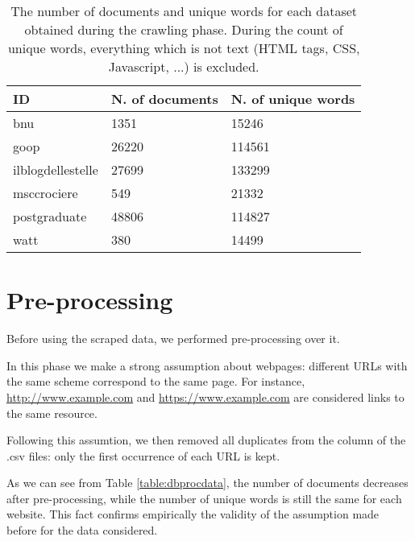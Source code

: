\begin{table}[H]
    \begin{center}
        \begin{tabular}{ |l|l|l| }
            \hline
            ID                & N. of documents & N. of unique words \\
            \hline
            bnu               & 1351            & 15246              \\
            \hline
            goop              & 26220           & 114561             \\
            \hline
            ilblogdellestelle & 27699           & 133299             \\
            \hline
            msccrociere       & 549             & 21332              \\
            \hline
            postgraduate      & 48806           & 114827             \\
            \hline
            watt              & 380             & 14499              \\
            \hline
        \end{tabular}
    \end{center}
    \caption{
        The number of documents and unique words for each dataset obtained during the crawling phase.
        During the count of unique words, everything which is not text (HTML tags, CSS, Javascript, ...) is excluded.
    }
    \label{table:dbdata}
\end{table}

\section{Pre-processing}
Before using the scraped data, we performed pre-processing over it.

In this phase we make a strong assumption about webpages:
different URLs with the same scheme correspond to the same page.
For instance, \url{http://www.example.com} and \url{https://www.example.com}
are considered links to the same resource.

Following this assumtion, we then removed all duplicates from the  column
of the .csv files: only the first occurrence of each URL is kept.

As we can see from Table \ref{table:dbprocdata}, the number of documents decreases after pre-processing,
while the number of unique words is still the same for each website.
This fact confirms empirically the validity of the assumption made before for the data considered.

